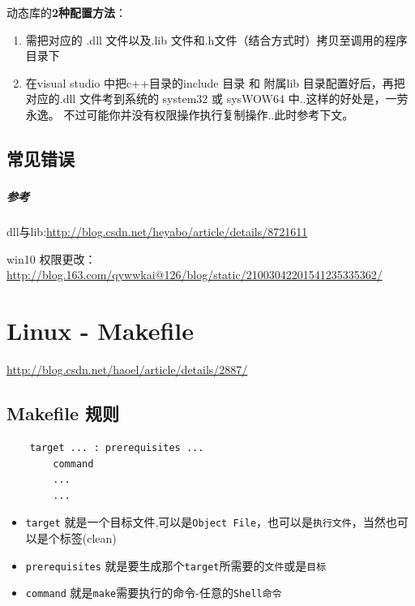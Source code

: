 \documentclass[UTF8,a4paper,12pt]{ctexbook} %
\begin{document}
			动态库的\textbf{2种配置方法}：
				\begin{enumerate}[itemindent = 2em]
					\item 需把对应的 .dll 文件以及.lib 文件和.h文件（结合方式时）拷贝至调用的程序目录下
					\item 在visual studio 中把c++目录的include 目录 和 附属lib 目录配置好后，再把对应的.dll 文件考到系统的 system32 或 sysWOW64 中..这样的好处是，一劳永逸。 不过可能你并没有权限操作执行复制操作..此时参考下文。
				\end{enumerate}
		
		\subsection{常见错误}
			\subsubsection{}	
			\subparagraph{参考}
			dll与lib:\url{http://blog.csdn.net/heyabo/article/details/8721611}
			
			win10 权限更改：\url{http://blog.163.com/qywwkai@126/blog/static/21003042201541235335362/}
	\section{Linux - Makefile}
	
			\url{http://blog.csdn.net/haoel/article/details/2887/}
		\subsection{Makefile 规则}
			\begin{lstlisting}
	target ... : prerequisites ...
		command
		...
		...
			\end{lstlisting}
			
			\begin{itemize}
				\item \verb|target| 就是一个目标文件,可以是\verb|Object File|，也可以是\verb|执行文件|，当然也可以是个标签(clean)
				\item \verb|prerequisites| 就是要生成那个\verb|target|所需要的\verb|文件|或是\verb|目标|
				\item \verb|command| 就是\verb|make|需要执行的命令-任意的\verb|Shell命令|
			\end{itemize}
			
\end{document}
